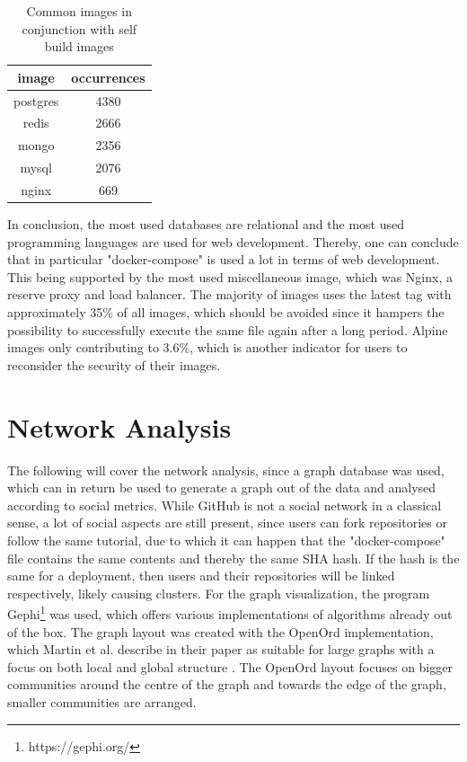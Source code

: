 \begin{table}[h!]
    \centering
    \begin{tabular}{ |c|c| }
    \hline
    image & occurrences \\
    \hline
         postgres & 4380 \\
         redis & 2666 \\
         mongo & 2356 \\
         mysql & 2076 \\
         nginx & 669 \\
    \hline
    \end{tabular}
    \caption{Common images in conjunction with self build images}
    \label{self_build_commons}
\end{table}

In conclusion, the most used databases are relational and the most used programming languages are used for web development. Thereby, one can conclude that in particular "docker-compose" is used a lot in terms of web development. This being supported by the most used miscellaneous image, which was Nginx, a reserve proxy and load balancer. The majority of images uses the latest tag with approximately 35\% of all images, which should be avoided since it hampers the possibility to successfully execute the same file again after a long period. Alpine images only contributing to 3.6\%, which is another indicator for users to reconsider the security of their images.

\section{Network Analysis}

The following will cover the network analysis, since a graph database was used, which can in return be used to generate a graph out of the data and analysed according to social metrics. While GitHub is not a social network in a classical sense, a lot of social aspects are still present, since users can fork repositories or follow the same tutorial, due to which it can happen that the "docker-compose" file contains the same contents and thereby the same SHA hash. If the hash is the same for a deployment, then users and their repositories will be linked respectively, likely causing clusters.
For the graph visualization, the program Gephi\footnote{https://gephi.org/} was used, which offers various implementations of algorithms already out of the box. The graph layout was created with the OpenOrd implementation, which Martin et al. describe in their paper as suitable for large graphs with a focus on both local and global structure \cite{openOrd}. The OpenOrd layout focuses on bigger communities around the centre of the graph and towards the edge of the graph, smaller communities are arranged.

